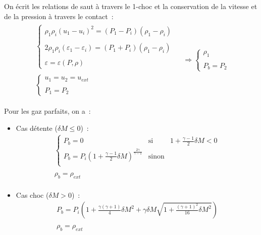 \begin{enumerate}
On écrit les relations de saut à travers le 1-choc
et la conservation de la vitesse et de la pression à travers le contact~:
\begin{equation}
\begin{array}{lll}
\begin{array}{l}
\left\{\begin{array}{l}
\rho_1 \rho_i (u_1 - u_i)^2
= (P_1 - P_i)(\rho_1 - \rho_i)\\
\\
2\rho_1 \rho_i (\varepsilon_1 - \varepsilon_i)
= (P_1 + P_i)(\rho_1 - \rho_i)\\
\\
\varepsilon = \varepsilon(P,\rho)
\end{array}\right.\\
\\
\left\{\begin{array}{l}
u_1 = u_2 = u_{ext}\\
\\
P_1 = P_2
\end{array}\right.
\end{array}
&
\Rightarrow
\left\{\begin{array}{l}
\rho_1\\
\\
P_b = P_2
\end{array}\right.
\end{array}
\end{equation}

\bigskip
Pour les gaz parfaits, on a~:

\begin{itemize}

\item Cas détente ($\delta M \leqslant 0$)~:\\
$$
\begin{array}{l}
\left\{\begin{array}{lll}
P_b=0 & \text{si} & 1 + \displaystyle\frac{\gamma-1}{2}\delta M<0\\
P_b = P_i \left(1 + \displaystyle\frac{\gamma-1}{2}\delta M\right)
^{\frac{2\gamma}{\gamma-1}} & \text{sinon}\\
\end{array}\right.\\
\\
\rho_b= \rho_{ext}\\
\end{array}
$$

\item Cas choc ($\delta M > 0$)~:\\
$$
\begin{array}{l}
P_b = P_i \left(1 + \displaystyle\frac{\gamma(\gamma+1)}{4}\delta M^2
+\gamma \delta M \displaystyle\sqrt{1+\displaystyle\frac{(\gamma+1)^2}{16}\delta M^2}\right)
\\
\\
\rho_b=\rho_{ext}\\
\end{array}
$$

\end{itemize}

\end{enumerate}


